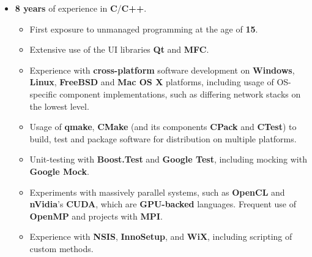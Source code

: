 \documentclass[11pt,a4paper,sans]{moderncv}
\begin{document}
	\vspace{7pt}

	\begin{itemize}
	\item	\label{softdevcpp}  \textbf{8 years} of experience in \textbf{C}/\textbf{C++}.
		\begin{itemize}
		\item	First exposure to unmanaged programming at the age of \textbf{15}.
		\item	Extensive use of the UI libraries \textbf{Qt} and \textbf{MFC}.
		\item	Experience with \textbf{cross-platform} software development on \textbf{Windows}, \textbf{Linux}, \textbf{FreeBSD} and \textbf{Mac OS X} platforms, including usage of OS-specific component implementations, such as differing network stacks on the lowest level.
		\item	Usage of \textbf{qmake}, \textbf{CMake} (and its components \textbf{CPack} and \textbf{CTest}) to build, test and package software for distribution on multiple platforms.
		\item	Unit-testing with \textbf{Boost.Test} and \textbf{Google Test}, including mocking with \textbf{Google Mock}.
		\item	Experiments with massively parallel systems, such as \textbf{OpenCL} and \textbf{nVidia}'s \textbf{CUDA}, which are \textbf{GPU-backed} languages. Frequent use of \textbf{OpenMP} and projects with \textbf{MPI}.
		\item	Experience with \textbf{NSIS}, \textbf{InnoSetup}, and \textbf{WiX}, including scripting of custom methods.
		\end{itemize}
	\end{itemize}

	\vspace{7pt}
\end{document}
